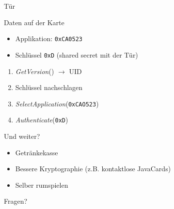 \documentclass{beamer}
\begin{document}
\begin{frame}{T\"ur}
  \begin{block}{Daten auf der Karte}
    \begin{itemize}
    \item Applikation: \texttt{0xCA0523}
    \item Schl\"ussel \texttt{0xD} (shared secret mit der T\"ur)
    \end{itemize}
  \end{block}
  \begin{enumerate}
  \item \emph{GetVersion}() $\rightarrow$ UID
  \item Schl\"ussel nachschlagen
  \item \emph{SelectApplication}(\texttt{0xCAO523})
  \item \emph{Authenticate}(\texttt{0xD})
  \end{enumerate}
\end{frame}

\begin{frame}{Und weiter?}
  \begin{itemize}
  \item Getr\"ankekasse
  \item Bessere Kryptographie (z.B. kontaktlose JavaCards)
  \item Selber rumspielen
  \end{itemize}
\end{frame}

\begin{frame}
  \begin{center}
    \Huge Fragen?
  \end{center}
\end{frame}
\end{document}
